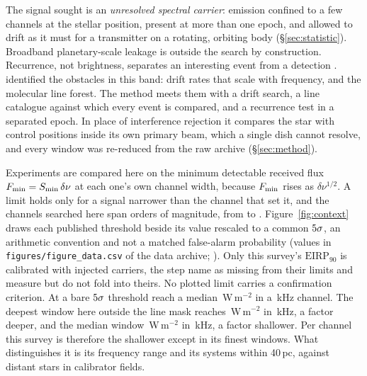 The signal sought is an \emph{unresolved spectral carrier}: emission confined
to a few channels at the stellar position, present at more than one epoch, and
allowed to drift as it must for a transmitter on a rotating, orbiting body
(\S\ref{sec:statistic}). Broadband planetary-scale leakage \citep{BRaTs2026} is
outside the search by construction. Recurrence, not brightness, separates an
interesting event from a detection \citep{Sheikh2021}. \citet{Mason2025}
identified the obstacles in this band: drift rates that scale with frequency,
and the molecular line forest. The method meets them with a drift search, a
line catalogue against which every event is compared, and a recurrence test in
a separated epoch. In place of interference rejection it compares the star
with control positions inside its own primary beam, which a single dish cannot
resolve, and every window was re-reduced from the raw archive
(\S\ref{sec:method}).

Experiments are compared here on the minimum detectable received flux
$F_{\rm min}=S_{\rm min}\,\delta\nu$ at each one's own channel width, because
$F_{\rm min}$ rises as $\delta\nu^{1/2}$. A limit holds only for a signal
narrower than the channel that set it, and the channels searched here span
\LtChanSpanDex{} orders of magnitude, from \LtChanNarrow{} to \LtChanWide.
Figure~\ref{fig:context} draws each published threshold beside its value
rescaled to a common $5\sigma$, an arithmetic convention and not a
matched false-alarm probability (values in \texttt{figures/figure\_data.csv}
of the data archive; \citealt{SIdeposit}). Only this survey's
$\mathrm{EIRP}_{90}$ is calibrated with injected carriers, the step
\citet{Price2020} name as missing from their limits and \citet{Margot2023}
measure but do not fold into theirs. No plotted limit carries a confirmation
criterion. At a bare $5\sigma$ threshold \citet{Mason2025} reach a
median \MasonFluxMed\,W\,m$^{-2}$ in a \MasonChanKHz\,kHz channel. The deepest
window here outside the line mask reaches \FluxTrigBest\,W\,m$^{-2}$ in
\FluxChanBestKHz\,kHz, a factor \FluxNatBestRatio{} deeper, and the median
window \FluxTrigMed\,W\,m$^{-2}$ in \FluxChanMedKHz\,kHz, a factor
\FluxNatMedRatio{} shallower. Per channel this survey is therefore the
shallower except in its finest windows. What distinguishes it is its frequency
range and its \NSysClassA{} systems within 40\,pc, against distant stars in
\MasonNCal{} calibrator fields.
